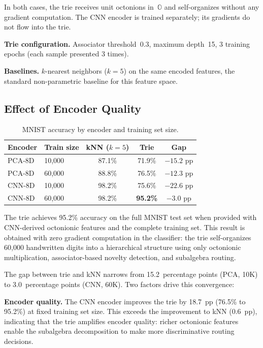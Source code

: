 \documentclass[11pt,a4paper]{article}
\theoremstyle{definition}
\theoremstyle{remark}
\newcommand{\Oct}{\mathbb{O}}
\begin{document}
In both cases, the trie receives unit octonions in~$\Oct$ and self-organizes without any gradient computation. The CNN encoder is trained separately; its gradients do not flow into the trie.

\textbf{Trie configuration.} Associator threshold~0.3, maximum depth~15, 3 training epochs (each sample presented 3 times).

\textbf{Baselines.} $k$-nearest neighbors ($k=5$) on the same encoded features, the standard non-parametric baseline for this feature space.

\subsection{Effect of Encoder Quality}

\begin{table}[ht]
\centering
\caption{MNIST accuracy by encoder and training set size.}
\label{tab:mnist_encoder}
\begin{tabular}{@{}llccc@{}}
\toprule
Encoder & Train size & kNN ($k{=}5$) & Trie & Gap \\
\midrule
PCA-8D   & 10,000  & 87.1\% & 71.9\% & $-15.2$ pp \\
PCA-8D   & 60,000  & 88.8\% & 76.5\% & $-12.3$ pp \\
CNN-8D   & 10,000  & 98.2\% & 75.6\% & $-22.6$ pp \\
CNN-8D   & 60,000  & 98.2\% & \textbf{95.2\%} & $-3.0$ pp \\
\bottomrule
\end{tabular}
\end{table}

The trie achieves 95.2\% accuracy on the full MNIST test set when provided with CNN-derived octonionic features and the complete training set. This result is obtained with zero gradient computation in the classifier: the trie self-organizes 60,000 handwritten digits into a hierarchical structure using only octonionic multiplication, associator-based novelty detection, and subalgebra routing.

The gap between trie and kNN narrows from 15.2~percentage points (PCA, 10K) to 3.0~percentage points (CNN, 60K). Two factors drive this convergence:

\textbf{Encoder quality.} The CNN encoder improves the trie by 18.7~pp (76.5\% to 95.2\%) at fixed training set size. This exceeds the improvement to kNN (0.6~pp), indicating that the trie amplifies encoder quality: richer octonionic features enable the subalgebra decomposition to make more discriminative routing decisions.
\end{document}
